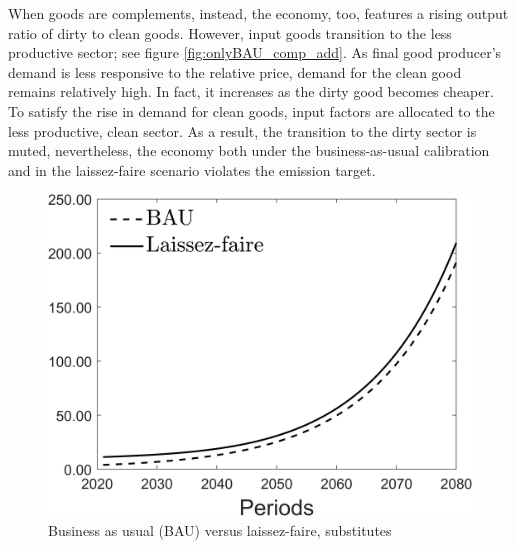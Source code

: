 When goods are complements, instead, the economy, too, features a rising output ratio of dirty to clean goods. However, input goods transition to the less productive sector; see figure \ref{fig:onlyBAU_comp_add}. As final good producer's demand is less responsive to the relative price, demand for the clean good remains relatively high.  In fact, it increases as the dirty good becomes cheaper. To satisfy the rise in demand for clean goods, input factors are allocated to the less productive, clean sector. As a result, the transition to the dirty sector is muted, nevertheless, the economy  both under the business-as-usual calibration and in the laissez-faire scenario violates the emission target.  

\begin{figure}[h!!]
	\centering
	\caption{Business as usual (BAU) versus laissez-faire, substitutes }\label{fig:onlyBAU_subs}
	\begin{minipage}[]{0.32\textwidth}
		\includegraphics[width=1\textwidth]{../../codding_model/Own/figures/Rep_agent/staticBAU_LF_separate_c_periods59_eppsilon4.00_zeta1.40_Ad08_Ac04_thetac0.70_thetad0.56_HetGrowth1_tauul0.181_util0_withtarget0_lgd1.png}
	\end{minipage}
	\begin{minipage}[]{0.32\textwidth}

\end{minipage}
\end{figure}
